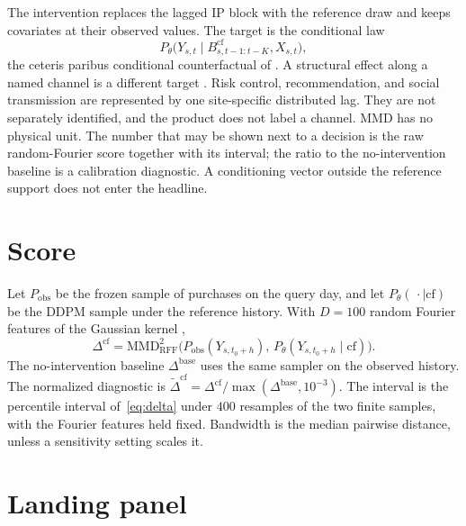 \documentclass[11pt]{article}
\begin{document}
The intervention replaces the lagged IP block with the reference draw and keeps covariates at their observed values.
The target is the conditional law
\[
P_\theta\bigl(Y_{s,t}\mid B^{\mathrm{cf}}_{s,t-1:t-K},X_{s,t}\bigr),
\]
the ceteris paribus conditional counterfactual of \citet{chernozhukov2013inference}.
A structural effect along a named channel is a different target \citep{pearl2009causality}.
Risk control, recommendation, and social transmission are represented by one site-specific distributed lag.
They are not separately identified, and the product does not label a channel.
MMD has no physical unit.
The number that may be shown next to a decision is the raw random-Fourier score together with its interval; the ratio to the no-intervention baseline is a calibration diagnostic.
A conditioning vector outside the reference support does not enter the headline.

\section{Score}
\label{sec:score}

Let $P_{\mathrm{obs}}$ be the frozen sample of purchases on the query day, and let $P_\theta(\,\cdot\mid\mathrm{cf})$ be the DDPM sample under the reference history.
With $D=100$ random Fourier features of the Gaussian kernel \citep{rahimi2007random,gretton2012kernel},
\begin{equation}
\label{eq:delta}
\Delta^{\mathrm{cf}}
=
\mathrm{MMD}^{2}_{\mathrm{RFF}}
\bigl(
P_{\mathrm{obs}}(Y_{s,t_0+h}),\,
P_\theta(Y_{s,t_0+h}\mid\mathrm{cf})
\bigr).
\end{equation}
The no-intervention baseline $\Delta^{\mathrm{base}}$ uses the same sampler on the observed history.
The normalized diagnostic is $\widetilde\Delta^{\mathrm{cf}}=\Delta^{\mathrm{cf}}/\max(\Delta^{\mathrm{base}},10^{-3})$.
The interval is the percentile interval of~\eqref{eq:delta} under $400$ resamples of the two finite samples, with the Fourier features held fixed.
Bandwidth is the median pairwise distance, unless a sensitivity setting scales it.

\section{Landing panel}
\label{sec:panel}
\end{document}
